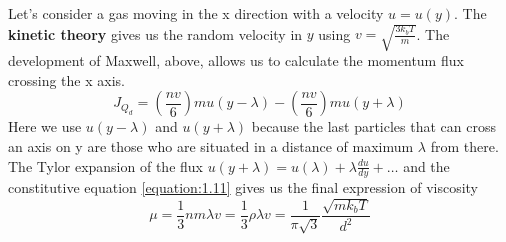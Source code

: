 	Let's consider a gas moving in the x direction with a velocity $u=u(y)$. The \textbf{kinetic theory} gives us the random velocity in $y$ using $v = \sqrt{\frac{3k_bT}{m}}$. The development of Maxwell, above, allows us to calculate the momentum flux crossing the x axis. 
	\begin{equation}
		J_{Q_d} = \left(\frac{nv}{6}\right)mu(y-\lambda) - \left(\frac{nv}{6}\right)mu(y+\lambda)
	\end{equation}
	Here we use $u(y-\lambda)$ and $u(y+\lambda)$ because the last particles that can cross an axis on y are those who are situated in a distance of maximum $\lambda$ from there. \\
	The Tylor expansion of the flux $u(y + \lambda) = u(\lambda) + \lambda\frac{du}{dy} + \dots$ and the constitutive equation \eqref{equation:1.11} gives us the final expression of viscosity 
	\begin{equation}
	\mu = \frac{1}{3}nm\lambda v = \frac{1}{3}\rho \lambda v = \frac{1}{\pi \sqrt{3}}\frac{\sqrt{mk_bT}}{d^2}
	\end{equation}
